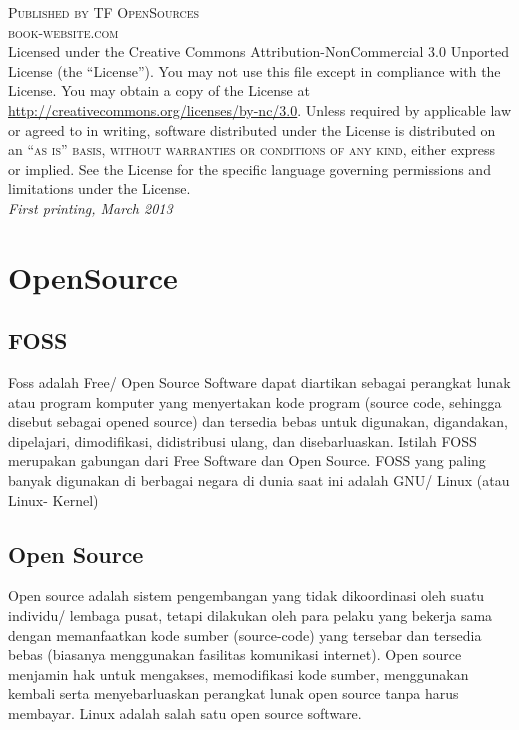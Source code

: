 \documentclass[11pt,fleqn]{book} %
\begin{document}
\noindent \textsc{Published by TF OpenSources}\\ %
\noindent \textsc{book-website.com}\\ %
\noindent Licensed under the Creative Commons Attribution-NonCommercial 3.0 Unported License (the ``License''). You may not use this file except in compliance with the License. You may obtain a copy of the License at \url{http://creativecommons.org/licenses/by-nc/3.0}. Unless required by applicable law or agreed to in writing, software distributed under the License is distributed on an \textsc{``as is'' basis, without warranties or conditions of any kind}, either express or implied. See the License for the specific language governing permissions and limitations under the License.\\ %
\noindent \textit{First printing, March 2013} %

\newpage
{} %
\pagestyle{empty} %
\tableofcontents %
\cleardoublepage %
\pagestyle{fancy} %

\newpage
{} %
\chapter{OpenSource}
\section{FOSS}
 \hspace{10pt} Foss adalah Free/ Open Source Software dapat diartikan sebagai perangkat lunak atau program komputer yang menyertakan kode program (source code, sehingga disebut sebagai opened source) dan tersedia bebas untuk digunakan, digandakan, dipelajari, dimodifikasi, didistribusi ulang, dan disebarluaskan. 
 Istilah FOSS merupakan gabungan dari Free Software dan Open Source. 
 FOSS yang paling banyak digunakan di berbagai negara di dunia saat ini adalah GNU/ Linux (atau Linux- Kernel)
\section{Open Source}
 \hspace{10pt} Open source adalah sistem pengembangan yang tidak dikoordinasi oleh suatu individu/ lembaga pusat, tetapi dilakukan oleh para pelaku yang bekerja sama dengan memanfaatkan kode sumber (source-code) yang tersebar dan tersedia bebas (biasanya menggunakan fasilitas komunikasi internet). 
 Open source menjamin hak untuk mengakses, memodifikasi kode sumber, menggunakan kembali serta menyebarluaskan perangkat lunak open source  tanpa harus membayar. 
 Linux adalah salah satu open source software.
\end{document}

